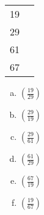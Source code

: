 \documentclass[12pt]{amsart}
\theoremstyle{plain}
\theoremstyle{definition}
\theoremstyle{remark}
\begin{document}
\begin{enumerate}[1.]
\begin{center}
\begin{tabular}{|p{1in}|p{3in}|}
			19 & \\
			29 & \\
			61 & \\
			67 & \\ \hline
			\end{tabular}
			\end{center}
		\begin{enumerate}[a.]
			\item $\left(\frac{19}{29}\right)$
				\begin{framed}
				\vspace{.1in}
				\end{framed}
			\item $\left(\frac{29}{19}\right)$
				\begin{framed}
				\vspace{.1in}
				\end{framed}
			\item $\left(\frac{29}{61}\right)$
				\begin{framed}
				\vspace{.1in}
				\end{framed}
			\item $\left(\frac{61}{29}\right)$
				\begin{framed}
				\vspace{.1in}
				\end{framed}
			\item $\left(\frac{67}{19}\right)$
				\begin{framed}
				\vspace{.1in}
				\end{framed}
			\item $\left(\frac{19}{67}\right)$
				\begin{framed}
				\vspace{.1in}
				\end{framed}
		\end{enumerate}
\end{enumerate}
\end{document}

